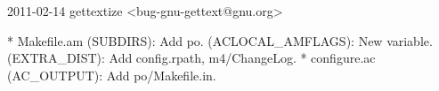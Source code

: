 
\begin{DoxyVerbInclude}
2011-02-14  gettextize  <bug-gnu-gettext@gnu.org>

	* Makefile.am (SUBDIRS): Add po.
	(ACLOCAL_AMFLAGS): New variable.
	(EXTRA_DIST): Add config.rpath, m4/ChangeLog.
	* configure.ac (AC_OUTPUT): Add po/Makefile.in.

\end{DoxyVerbInclude}
 